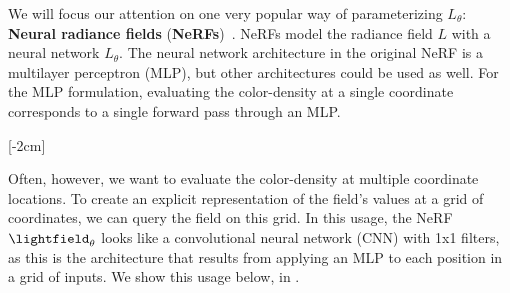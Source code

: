 We will focus our attention on one very popular way of parameterizing $L_{\theta}$: \textbf{Neural radiance fields} (\textbf{NeRFs})~\cite{mildenhall2020nerf}. NeRFs model the radiance field $L$ with a neural network $L_{\theta}$.
The neural network architecture in the original NeRF is a multilayer perceptron (MLP), but other architectures could be used as well. For the MLP formulation, evaluating the color-density at a single
coordinate corresponds to a single forward pass through an MLP.

[-2cm]

Often, however, we want to evaluate the color-density at multiple coordinate locations. To create an explicit representation of the field's values at a grid of coordinates, we can query the field on this grid. In this usage, the NeRF $\lightfield_{\theta}$ looks like a convolutional neural network (CNN) with 1x1 filters,
as this is the architecture that results from applying an MLP to each position in a grid of inputs. We show this usage below, in \fig{\ref{fig:nerfs:image_to_image_arch}}.%


